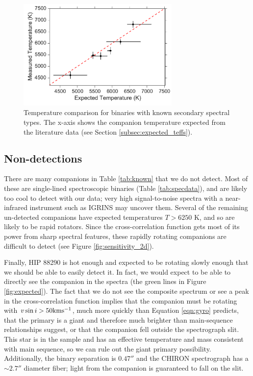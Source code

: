 \documentclass{emulateapj}
\begin{document}
\begin{figure}
        \centering
        \includegraphics[width=80mm]{Known_Binaries.pdf}
        
        \caption{Temperature comparison for binaries with known secondary spectral types. The x-axis shows the companion temperature expected from the literature data (see Section \ref{subsec:expected_teffs}).}
         \label{fig:known}
\end{figure}


\subsection{Non-detections}
\label{sec:nondetections}
There are many companions in Table \ref{tab:known} that we do not detect. Most of these are single-lined spectroscopic binaries (Table \ref{tab:specdata}), and are likely too cool to detect with our data; very high signal-to-noise spectra with a near-infrared instrument such as IGRINS may uncover them. Several of the remaining un-detected companions have expected temperatures $T  > 6250$ K, and so are likely to be rapid rotators. Since the cross-correlation function gets most of its power from  sharp spectral features, these rapidly rotating companions are difficult to detect (see Figure \ref{fig:sensitivity_2d}).  

Finally, HIP 88290 is hot enough and expected to be rotating slowly enough that we should be able to easily detect it. In fact, we would expect to be able to directly see the companion in the spectra (the green lines in Figure \ref{fig:expected}). The fact that we do not see the composite spectrum or see a peak in the cross-correlation function implies that the companion must be rotating with $v\sin{i} > 50 \rm km s^{-1}$, much more quickly than Equation \ref{eqn:gyro} predicts, that the primary is a giant and therefore much brighter than main-sequence relationships suggest, or that the companion fell outside the spectrograph slit. This star is in the \cite{David2015} sample and has an effective temperature and mass consistent with main sequence, so we can rule out the giant primary possibility. Additionally, the binary separation is $0.47''$ \citep{Tokovinin2015} and the CHIRON spectrograph has a $\sim 2.7''$ diameter fiber; light from the companion is guaranteed to fall on the slit.
\end{document}
